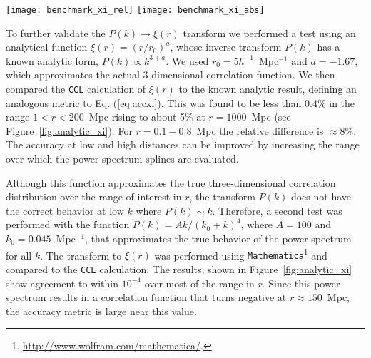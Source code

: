 \documentclass[\docopts]{\docclass}
\newcommand{\ccl}{{\tt CCL}\xspace}
\newcommand{\halofit}{{\tt halofit}\xspace}
\begin{document}
\begin{figure*}
\centering
\texttt{[image: benchmark\_xi\_rel]}
\texttt{[image: benchmark\_xi\_abs]} 
\caption{Comparison of the \ccl calculation of the three-dimensional spatial correlation function $\xi(r)$ with a precise, numerical transform of the \ccl non-linear \halofit power spectrum. The left panel shows the relative error $\Delta \xi(r) / \xi(r)$. The right panel shows the absolute error in $r^2 \xi(r)$. Both panels are for the CCL1 model of Table~\ref{tab:cosmologies} at redshift zero. The comparison made with 40 points in the range $r = 0.1 - 100$~Mpc (blue curve) and 100 points in the region $r = 50 - 250$~Mpc encompassing the baryon acoustic oscillation peak.}
\label{fig:benchmark_xi}
\end{figure*}

To further validate the $P(k) \to \xi(r)$ transform we performed a test using an analytical function $\xi(r) = (r / r_0)^a$, whose inverse transform $P(k)$ has a known analytic form, $P(k) \propto k^{3+a}$. We used $r_0 = 5 h^{-1}$~Mpc$^{-1}$ and $a = -1.67$, which approximates the actual 3-dimensional correlation function.  We then compared the \ccl calculation of $\xi(r)$ to the known analytic result, defining an analogous metric to Eq. (\ref{eq:accxi}). This was found to be less than 0.4\% in the range $1 < r < 200$~Mpc rising to about 5\% at $r = 1000$~Mpc (see Figure~\ref{fig:analytic_xi}). For $r=0.1-0.8$~Mpc the relative difference is $\approx$8\%. The accuracy at low and high distances can be improved by increasing the range over which the power spectrum splines are evaluated. 

Although this function approximates the true three-dimensional correlation distribution over the range of interest in $r$, the transform $P(k)$ does not have the correct behavior at low $k$ where $P(k) \sim  k$. Therefore, a second test was performed with the function $P(k) = A k / (k_0 + k)^4$, where $A = 100$ and $k_0 = 0.045$~Mpc$^{-1}$, that approximates the true behavior of the power spectrum for all $k$.
The transform to $\xi(r)$ was performed using {\tt Mathematica}\footnote{\url{http://www.wolfram.com/mathematica/}.} and compared to the \ccl calculation. The results, shown in Figure~\ref{fig:analytic_xi} show agreement to within $10^{-4}$ over most of the range in $r$. Since this power spectrum results in a correlation function that turns negative at $r \approx 150$~Mpc, the accuracy metric is large near this value. 
\end{document}
